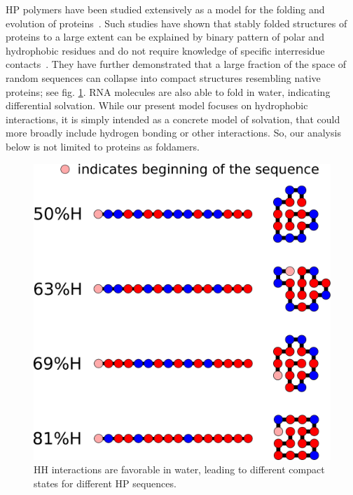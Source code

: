\documentclass[journal=jacsat,manuscript=article,layout=twocolumn]{achemso}
\begin{document}
HP polymers have been studied extensively as a model for the folding and 
evolution of proteins~\cite{lau1989lattice,Chan1991,Miller1995,Yue1995,agarwala1997local}.  Such 
studies have shown that stably folded structures of proteins to a large extent can be explained by 
binary pattern of polar and hydrophobic residues and do not require knowledge of specific 
interresidue contacts~\cite{Yue1992,Xiong1995,Fisher2011}. They have further demonstrated that 
a large fraction of the space of random sequences can 
collapse into compact structures resembling native proteins\cite{lau1989lattice}; see fig. 
\ref{fig:hydro-effect}.  RNA molecules are also able to fold in water, indicating differential 
solvation.  While our present model focuses on hydrophobic interactions, it is simply intended as a 
concrete model of solvation, that could more broadly include hydrogen bonding or other interactions. 
 So, our analysis below is not limited to proteins as foldamers.

\begin{figure}[h!]
  \centering
  \includegraphics[width=\columnwidth]{pictures/tst-seqs.pdf} 
  \caption{HH interactions are favorable in water, leading to different 
compact states for different 
HP sequences.}
  \label{fig:hydro-effect}
\end{figure}
\end{document}
